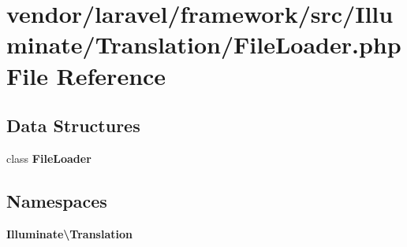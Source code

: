 \section{vendor/laravel/framework/src/\+Illuminate/\+Translation/\+File\+Loader.php File Reference}
\label{laravel_2framework_2src_2_illuminate_2_translation_2_file_loader_8php}
\subsection*{Data Structures}
\begin{DoxyCompactItemize}
\item 
class {\bf File\+Loader}
\end{DoxyCompactItemize}
\subsection*{Namespaces}
\begin{DoxyCompactItemize}
\item 
 {\bf Illuminate\textbackslash{}\+Translation}
\end{DoxyCompactItemize}
